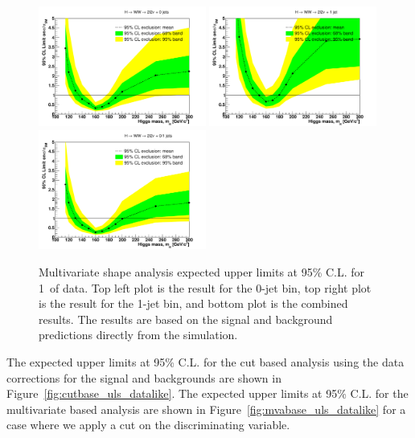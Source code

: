 \begin{figure}[!htbp]
\begin{center}
   \includegraphics[width=0.49\textwidth]{figures/limits_0j_1000pb_shape.pdf}
   \includegraphics[width=0.49\textwidth]{figures/limits_1j_1000pb_shape.pdf}
   \includegraphics[width=0.49\textwidth]{figures/limits_nj_1000pb_shape.pdf}
   \caption{Multivariate shape analysis expected upper limits at 95\% C.L. for 1\ifb\ of data. Top left plot 
   is the result for the 0-jet bin, top right plot is the result for the 1-jet bin, and 
   bottom plot is the combined results. The results 
   are based on the signal and background predictions directly from the simulation.}
   \label{fig:mvashape_uls}
\end{center}
\end{figure}

The expected upper limits at 95\% C.L. for the cut based analysis using the data corrections 
for the signal and backgrounds are shown in Figure~\ref{fig:cutbase_uls_datalike}. The expected upper limits at
95\% C.L. for the multivariate based analysis are shown in
Figure~\ref{fig:mvabase_uls_datalike} for a case where we apply a cut on the
discriminating variable.

